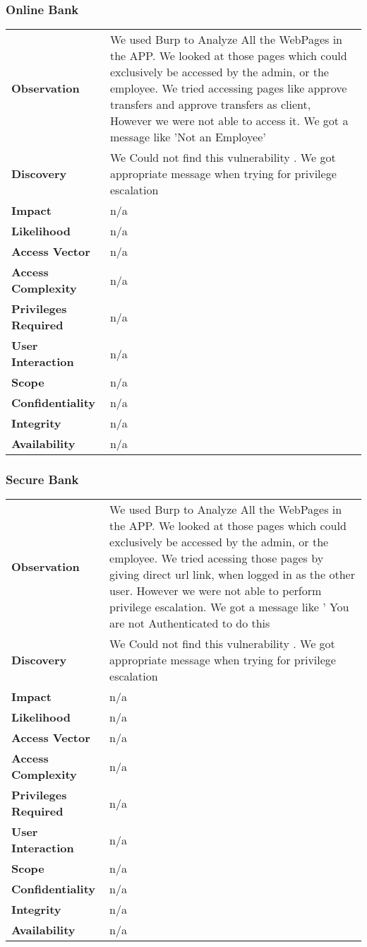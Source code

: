 \subsubsection{Online Bank}
\begin{tabular}{l|p{10cm}}
\textbf{Observation} & We used Burp to Analyze All the WebPages in the APP. We looked at those pages which could exclusively be accessed by the admin, or the employee. We tried accessing pages like approve transfers and approve transfers as client, However we were not able to access it. We got a message like 'Not an Employee'  \\
\textbf{Discovery} & We Could not find this vulnerability . We got appropriate message when trying for privilege escalation \\
\textbf{Impact} &  n/a\\
\textbf{Likelihood} & n/a \\
\textbf{Access Vector} & n/a \\
\textbf{Access Complexity} & n/a \\
\textbf{Privileges Required} & n/a \\
\textbf{User Interaction} & n/a \\
\textbf{Scope} & n/a \\
\textbf{Confidentiality} & n/a \\
\textbf{Integrity} & n/a \\
\textbf{Availability} & n/a \\
\end{tabular}

\subsubsection{Secure Bank}
\begin{tabular}{l|p{10cm}}
\textbf{Observation} & We used Burp to Analyze All the WebPages in the APP. We looked at those pages which could exclusively be accessed by the admin, or the employee. We tried acessing those pages by giving direct url link, when logged in as the other user. However we were not able to perform privilege escalation. We got a message like ' You are not Authenticated to do this  \\
\textbf{Discovery} & We Could not find this vulnerability . We got appropriate message when trying for privilege escalation \\
\textbf{Impact} &  n/a\\
\textbf{Likelihood} & n/a \\
\textbf{Access Vector} & n/a \\
\textbf{Access Complexity} & n/a \\
\textbf{Privileges Required} & n/a \\
\textbf{User Interaction} & n/a \\
\textbf{Scope} & n/a \\
\textbf{Confidentiality} & n/a \\
\textbf{Integrity} & n/a \\
\textbf{Availability} & n/a \\
\end{tabular}
